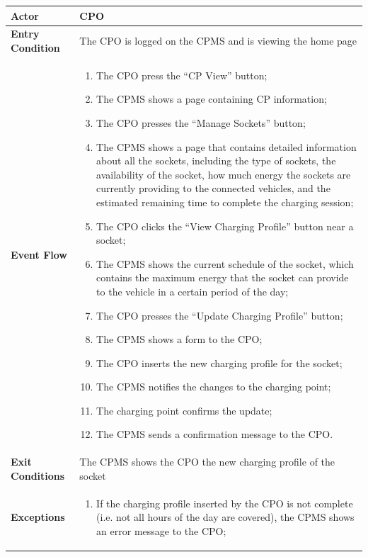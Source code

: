 \documentclass{Configuration_Files/PoliMi3i_thesis}
\begin{document}

\begin{table}[H]
    \begin{tabularx}{\textwidth}{| >{\columncolor{bluepoli!40}}l | X |}
    \hline
    \textbf{Actor} & CPO\T\B \\
    \hline
    \textbf{Entry Condition} & The CPO is logged on the CPMS and is viewing the home page\T\B\\
    \hline
    \textbf{Event Flow} & 
        \begin{enumerate}
        \item The CPO press the “CP View” button;
        \item The CPMS shows a page containing CP information;
        \item The CPO presses the “Manage Sockets” button;
        \item The CPMS shows a page that contains detailed information about all the sockets, including the type of sockets, the availability of the socket, how much energy the sockets are currently providing to the connected vehicles, and the estimated remaining time to complete the charging session;
        \item The CPO clicks the “View Charging Profile” button near a socket;
        \item The CPMS shows the current schedule of the socket, which contains the maximum energy that the socket can provide to the vehicle in a certain period of the day;
        \item The CPO presses the “Update Charging Profile” button;
        \item The CPMS shows a form to the CPO;
        \item The CPO inserts the new charging profile for the socket;
        \item The CPMS notifies the changes to the charging point;
        \item The charging point confirms the update;
        \item The CPMS sends a confirmation message to the CPO.
        \end{enumerate}\B\\
    \hline
    \textbf{Exit Conditions} & The CPMS shows the CPO the new charging profile of the socket\B\\
    \hline
    \textbf{Exceptions} & 
    \begin{enumerate}
        \item If the charging profile inserted by the CPO is not complete (i.e. not all hours of the day are covered), the CPMS shows an error message to the CPO;

\end{enumerate}
\end{tabularx}
\end{table}
\end{document}
